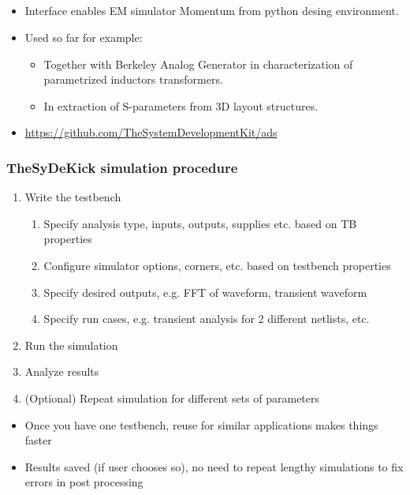 \documentclass{sdkslides}
\newcommand{\sectname}{Section Name}
\begin{document}
\subsection*{\sectionname}
\begin{frame}[c]
    \frametitle{\sectionname}
    \begin{itemize}
        \item Interface enables EM simulator Momentum from python desing
            environment.
        \item Used so far for example:
            \begin{itemize}
                \item Together with Berkeley Analog Generator in
                    characterization of parametrized inductors transformers.
                \item In extraction of S-parameters from 3D layout structures.
            \end{itemize}
            \item \url{https://github.com/TheSystemDevelopmentKit/ads}
    \end{itemize}
\end{frame}
\renewcommand{\sectname}{TheSyDeKick simulation procedure}
\begin{frame}[t]
    \frametitle{\sectname}
        \begin{enumerate}
            \item Write the testbench
            \begin{enumerate}
                \item Specify analysis type, inputs, outputs, supplies etc. based on TB properties
                \item Configure simulator options, corners, etc. based on
                    testbench properties
                \item Specify desired outputs, e.g. FFT of waveform, transient waveform
                \item Specify run cases, e.g. transient analysis for 2 different netlists, etc.
            \end{enumerate}
            \item Run the simulation
            \item Analyze results
            \item (Optional) Repeat simulation for different sets of parameters
        \end{enumerate}
        \begin{itemize}
            \item Once you have one testbench, reuse for similar applications makes things faster
            \item Results saved (if user chooses so), no need to repeat lengthy simulations to fix errors in post processing
        \end{itemize}
\end{frame}
\end{document}
